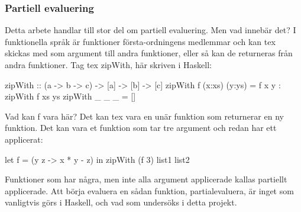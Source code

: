 \documentclass[Rapport]{subfiles}
\begin{document}
\subsubsection{Partiell evaluering}
Detta arbete handlar till stor del om partiell evaluering. Men vad innebär det?
I funktionella språk är funktioner första-ordningens medlemmar och kan tex
skickas med som argument till andra funktioner, eller så kan de returneras från
andra funktioner. Tag tex zipWith, här skriven i Haskell:
\begin{codeEx}
zipWith :: (a -> b -> c) -> [a] -> [b] -> [c]
zipWith f (x:xs) (y:ys) = f x y : zipWith f xs ys
zipWith _ _      _      = []
\end{codeEx}
Vad kan f vara här? Det kan tex vara en unär funktion som returnerar en ny
funktion. Det kan vara et funktion som tar tre argument och redan har ett
applicerat:
\begin{codeEx}
let f = (\x y z -> x * y - z)
in  zipWith (f 3) list1 list2
\end{codeEx}
Funktioner som har några, men inte alla argument applicerade kallas 
partiellt applicerade. Att börja evaluera en sådan funktion, partialevaluera,
är inget som vanligtvis görs i Haskell, och vad som undersöks i detta projekt. 
\end{document}
